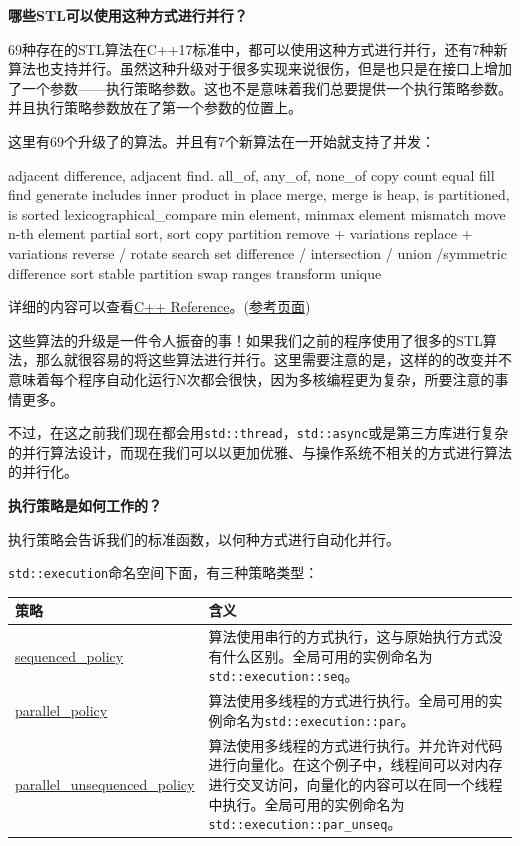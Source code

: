 \textbf{哪些STL可以使用这种方式进行并行？}

69种存在的STL算法在C++17标准中，都可以使用这种方式进行并行，还有7种新算法也支持并行。虽然这种升级对于很多实现来说很伤，但是也只是在接口上增加了一个参数——执行策略参数。这也不是意味着我们总要提供一个执行策略参数。并且执行策略参数放在了第一个参数的位置上。

这里有69个升级了的算法。并且有7个新算法在一开始就支持了并发：

\begin{codebox}[cpp]
adjacent difference, adjacent find.
all_of, any_of, none_of
copy
count
equal
fill
find
generate
includes
inner product
in place merge, merge
is heap, is partitioned, is sorted
lexicographical_compare
min element, minmax element
mismatch
move
n-th element
partial sort, sort copy
partition
remove + variations
replace + variations
reverse / rotate
search
set difference / intersection / union /symmetric difference
sort
stable partition
swap ranges
transform
unique
\end{codebox}

详细的内容可以查看\href{http://en.cppreference.com/w/cpp/experimental/parallelism/existing}{C++ Reference}。(\href{https://www.bfilipek.com/2017/08/cpp17-details-parallel.html}{参考页面})

这些算法的升级是一件令人振奋的事！如果我们之前的程序使用了很多的STL算法，那么就很容易的将这些算法进行并行。这里需要注意的是，这样的的改变并不意味着每个程序自动化运行N次都会很快，因为多核编程更为复杂，所要注意的事情更多。

不过，在这之前我们现在都会用\texttt{std::thread}，\texttt{std::async}或是第三方库进行复杂的并行算法设计，而现在我们可以以更加优雅、与操作系统不相关的方式进行算法的并行化。

\textbf{执行策略是如何工作的？}

执行策略会告诉我们的标准函数，以何种方式进行自动化并行。

\texttt{std::execution}命名空间下面，有三种策略类型：

\begin{table}[htbp]\centering
\begin{tabularx}{\textwidth}{XX}
\toprule
策略 & 含义 \\
\midrule
\href{https://zh.cppreference.com/w/cpp/algorithm/execution_policy_tag_t}{sequenced\_policy} & 算法使用串行的方式执行，这与原始执行方式没有什么区别。全局可用的实例命名为\texttt{std::execution::seq}。 \\
\href{https://zh.cppreference.com/w/cpp/algorithm/execution_policy_tag_t}{parallel\_policy} & 算法使用多线程的方式进行执行。全局可用的实例命名为\texttt{std::execution::par}。 \\
\href{https://zh.cppreference.com/w/cpp/algorithm/execution_policy_tag_t}{parallel\_unsequenced\_policy} & 算法使用多线程的方式进行执行。并允许对代码进行向量化。在这个例子中，线程间可以对内存进行交叉访问，向量化的内容可以在同一个线程中执行。全局可用的实例命名为\texttt{std::execution::par\_unseq}。 \\
\bottomrule
\end{tabularx}
\end{table}

